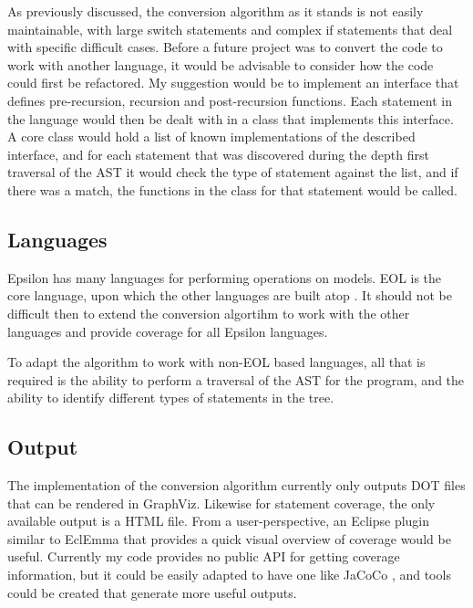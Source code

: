 As previously discussed, the conversion algorithm as it stands is not easily maintainable, with large switch statements and complex if statements that deal with specific difficult cases. Before a future project was to convert the code to work with another language, it would be advisable to consider how the code could first be refactored. My suggestion would be to implement an interface that defines pre-recursion, recursion and post-recursion functions. Each statement in the language would then be dealt with in a class that implements this interface. A core class would hold a list of known implementations of the described interface, and for each statement that was discovered during the depth first traversal of the AST it would check the type of statement against the list, and if there was a match, the functions in the class for that statement would be called.

\subsection{Languages}

Epsilon has many languages for performing operations on models. EOL is the core language, upon which the other languages are built atop \citep{epsilonBook}. It should not be difficult then to extend the conversion algortihm to work with the other languages and provide coverage for all Epsilon languages.

To adapt the algorithm to work with non-EOL based languages, all that is required is the ability to perform a traversal of the AST for the program, and the ability to identify different types of statements in the tree.

\subsection{Output}
The implementation of the conversion algorithm currently only outputs DOT files that can be rendered in GraphViz. Likewise for statement coverage, the only available output is a HTML file. From a user-perspective, an Eclipse plugin similar to EclEmma that provides a quick visual overview of coverage would be useful. Currently my code provides no public API for getting coverage information, but it could be easily adapted to have one like JaCoCo \citep{JaCoCo}, and tools could be created that generate more useful outputs.



